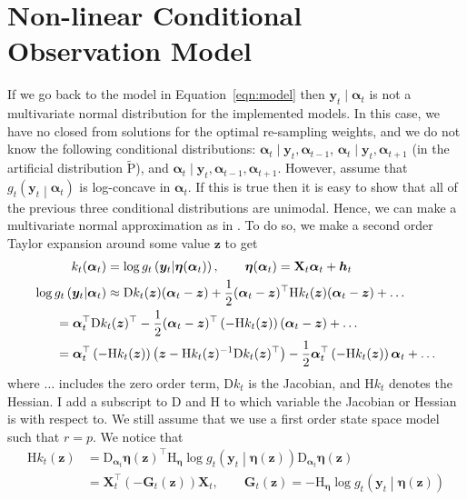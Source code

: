 \documentclass[notitlepage]{article}
\renewcommand{\vec}[1]{\bm{#1}}
\newcommand{\mat}[1]{\mathbf{#1}}
\newcommand{\Lparen}[1]{\left( #1\right)}
\newcommand{\Cond}[2]{ #1 \middle\vert  #2}
\newcommand{\Prob}{\text{P}}
\newcommand{\optor}[2]{#1\Lparen{#2}}
\newcommand{\optorC}[3]{\optor{#1}{\Cond{#2}{#3}}}
\newcommand{\dimState}{p}
\newcommand{\dimRng}{r}
\newcommand\Jaco{\mathrm D}
\newcommand\Hess{\mathrm H}
\begin{document}
\section{Non-linear Conditional Observation Model}\label{sec:NonLinObs}
If we go back to the model in Equation~\eqref{eqn:model} then $\vec y_t
\mid \vec\alpha_t$ is not a multivariate normal distribution for the 
implemented models.   
In this case, we have no closed from solutions
for the optimal re-sampling weights, and we do not know the following conditional 
distributions: $\vec\alpha_t \mid \vec y_t, \vec\alpha_{t-1}$, 
$\vec\alpha_t \mid \vec y_t, \vec\alpha_{t+1}$ (in the artificial 
distribution $\widetilde{\Prob}$), and 
$\vec\alpha_t \mid \vec y_t, \vec\alpha_{t-1}, \vec\alpha_{t+1}$. 
However, assume that $\optorC{g_t}{\vec{y}_t}{\vec{\alpha}_t}$ 
is log-concave in $\vec{\alpha}_t$. If this is true then it is easy 
to show that all of the previous three conditional distributions are 
unimodal. Hence, we can make a multivariate normal approximation as in \cite{pitt99}. To do so, we
 make a second order Taylor expansion around some value $\vec z$ 
to get%
%
\begin{align*}
k_t(\vec\alpha_t) &= \log\optorC{g_t}{\vec y_t}{\vec\eta(\vec\alpha_t)}, 
	\qquad \vec\eta(\vec\alpha_t) = \mat{X}_t\vec{\alpha}_t + \vec h_t \\
\log\optorC{g_t}{\vec{y}_t}{\vec\alpha_t}&\approx
	\Jaco k_t(\vec z) (\vec\alpha_t - \vec z) 
	+  \frac 12(\vec\alpha_t - \vec z)^\top
	\Hess k_t(\vec z)
	(\vec\alpha_t - \vec z) + \dots \\
&\hspace{-40pt}= \vec\alpha_t^\top \Jaco k_t(\vec z)^\top -
	\frac 12(\vec\alpha_t - \vec z)^\top
	\Lparen{-\Hess k_t(\vec z)}
	(\vec\alpha_t - \vec z) + \dots \\
&\hspace{-40pt}= \vec\alpha_t^\top\Lparen{-\Hess k_t(\vec z)}\Lparen{
	\vec z - \Hess k_t(\vec z)^{-1}\Jaco k_t(\vec z)^\top} 
	- \frac 12 \vec\alpha_t^\top\Lparen{-\Hess k_t(\vec z)}\vec\alpha_t + \dots
\end{align*}%
%
where $\dots$ includes the zero order term, $\Jaco k_t$ is the Jacobian,
and $\Hess k_t$ denotes the Hessian. I add a subscript to $\Jaco$ and $\Hess$
to which variable the Jacobian or Hessian is with respect to.
We still assume that we use a first 
order state space model such that $\dimRng = \dimState$. We notice that %
%
\begin{align*}
\Hess k_t(\vec z) &= 
	\Jaco_{\vec\alpha_t}\vec\eta(\vec z)^\top
	\Hess_{\vec\eta}\log\optorC{g_t}{\vec y_t}{\vec\eta(\vec z)}
	\Jaco_{\vec\alpha_t}\vec\eta(\vec z) \\
	&=\mat X_t^\top(-\mat G_t(\vec z))\mat X_t, \qquad 
	\mat G_t(\vec z) = -\Hess_{\vec\eta}\log\optorC{g_t}{\vec y_t}{\vec\eta(\vec z)}
\end{align*}%
\end{document}
